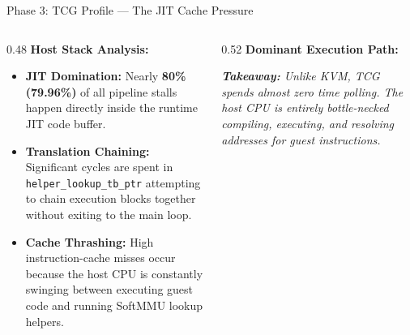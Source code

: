 \documentclass[aspectratio=169]{beamer} %
\begin{document}
  \begin{frame}{Phase 3: TCG Profile — The JIT Cache Pressure}
      \begin{columns}[T]
          \begin{column}{0.48\textwidth}
              \textbf{Host Stack Analysis:}
              \begin{itemize}\small
                  \item \textbf{JIT Domination:} Nearly \textbf{80\% (79.96\%)} of all pipeline stalls happen directly inside the runtime JIT code buffer.
                  \item \textbf{Translation Chaining:} Significant cycles are spent in \texttt{helper\_lookup\_tb\_ptr} attempting to chain execution blocks together without exiting to the main loop.
                  \item \textbf{Cache Thrashing:} High instruction-cache misses occur because the host CPU is constantly swinging between executing guest code and running SoftMMU lookup helpers.
              \end{itemize}
          \end{column}

          \begin{column}{0.52\textwidth}
              \textbf{Dominant Execution Path:}
              \vspace{0.3cm}
              \begin{center}
              \end{center}
              \vspace{0.4cm}
              \footnotesize \textit{\textbf{Takeaway:} Unlike KVM, TCG spends almost zero time polling. The host CPU is entirely bottle-necked compiling, executing, and resolving addresses for guest instructions.}
          \end{column}
      \end{columns}
  \end{frame}
\end{document}
